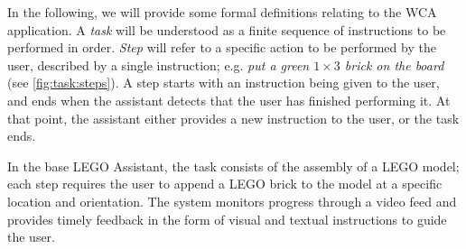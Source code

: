 In the following, we will provide some formal definitions relating to the WCA application.
A \emph{task} will be understood as a finite sequence of instructions to be performed in order.
\emph{Step} will refer to a specific action to be performed by the user, described by a single instruction; e.g. \emph{put a green \(1 \times 3\) brick on the board} (see \cref{fig:task:steps}).
A step starts with an instruction being given to the user, and ends when the assistant detects that the user has finished performing it.
At that point, the assistant either provides a new instruction to the user, or the task ends.

\begin{figure*}[h]
  \centering
  \caption{Example of a Cognitive Assistance task and its component steps.}\label{fig:task:steps}
\end{figure*}




In the base LEGO Assistant, the task consists of the assembly of a LEGO model; each step requires the user to append a LEGO brick to the model at a specific location and orientation.
The system monitors progress through a video feed and provides timely feedback in the form of visual and textual instructions to guide the user. 

